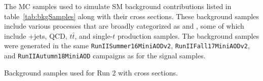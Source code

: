 The MC samples used to simulate SM background contributions listed in table~\ref{tab:bkgSamples} along with their cross sections. %
These background samples include various processes that are broadly categorized as \Wjets and \WVt, some of which include \DY+jets, QCD, $t\bar{t}$, and single-$t$ production samples.
The background samples were generated in the same \texttt{RunIISummer16MiniAODv2}, \texttt{RunIIFall17MiniAODv2}, and \texttt{RunIIAutumn18MiniAOD} campaigns as for the signal samples.

\begin{table}
  \centering
  
  \caption{
    Background samples used for Run 2 with cross sections.
  }
  \label{tab:bkgSamples}
\end{table}

%  

%  
